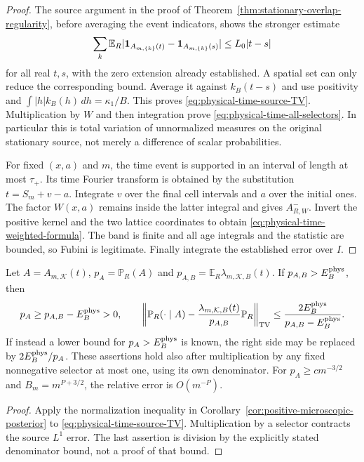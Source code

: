 \begin{proof}
The source argument in the proof of
Theorem~\ref{thm:stationary-overlap-regularity}, before averaging the
event indicators, shows the stronger estimate
\[
 \sum_k\mathbb E_R|\mathbf1_{A_{m,\{k\}}(t)}-
                       \mathbf1_{A_{m,\{k\}}(s)}|\le L_0|t-s|
\]
for all real $t,s$, with the zero extension already established.
A spatial set can only reduce the corresponding bound. Average it
against $k_B(t-s)$ and use positivity and
$\int |h|k_B(h)\,dh=\kappa_1/B$. This proves
\eqref{eq:physical-time-source-TV}. Multiplication by $W$ and then
integration prove \eqref{eq:physical-time-all-selectors}. In particular
this is total variation of unnormalized measures on the original
stationary source, not merely a difference of scalar probabilities.

For fixed $(x,a)$ and $m$, the time event is supported in an interval
of length at most $\tau_+$. Its time Fourier transform is obtained by
the substitution $t=S_m+v-a$. Integrate $v$ over the final cell
intervals and $a$ over the initial ones. The factor $W(x,a)$ remains
inside the latter integral and gives $A^-_{R,W}$. Invert the positive
kernel and the two lattice coordinates to obtain
\eqref{eq:physical-time-weighted-formula}. The band is finite and all
age integrals and the statistic are bounded, so Fubini is legitimate.
Finally integrate the established error over $I$.
\end{proof}

\begin{corollary}
\label{cor:direct-physical-posterior}
Let $A=A_{m,\mathcal K}(t)$, $p_A=\mathbb P_R(A)$ and
$p_{A,B}=\mathbb E_R\lambda_{m,\mathcal K,B}(t)$. If
$p_{A,B}>E_B^{\rm phys}$, then
\[
 p_A\ge p_{A,B}-E_B^{\rm phys}>0,\qquad
 \left\|\mathbb P_R(\cdot\mid A)-
          \frac{\lambda_{m,\mathcal K,B}(t)}{p_{A,B}}\mathbb P_R\right\|_{\operatorname{TV}}
                \le\frac{2E_B^{\rm phys}}{p_{A,B}-E_B^{\rm phys}}.
\]
If instead a lower bound for $p_A>E_B^{\rm phys}$ is known, the right
side may be replaced by $2E_B^{\rm phys}/p_A$. These assertions hold
also after multiplication by any fixed nonnegative selector at most
one, using its own denominator. For $p_A\ge c m^{-3/2}$ and
$B_m=m^{P+3/2}$, the relative error is $O(m^{-P})$.
\end{corollary}
\begin{proof}
Apply the normalization inequality in
Corollary~\ref{cor:positive-microscopic-posterior} to
\eqref{eq:physical-time-source-TV}. Multiplication by a selector
contracts the source $L^1$ error. The last assertion is division by
the explicitly stated denominator bound, not a proof of that bound.
\end{proof}

